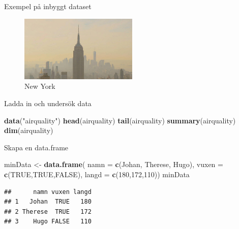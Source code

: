 \documentclass[
  11pt,
  ignorenonframetext,
]{beamer}
\newenvironment{Shaded}{\begin{snugshade}}{\end{snugshade}}
\newcommand{\DataTypeTok}[1]{\textcolor[rgb]{0.13,0.29,0.53}{#1}}
\newcommand{\DecValTok}[1]{\textcolor[rgb]{0.00,0.00,0.81}{#1}}
\newcommand{\KeywordTok}[1]{\textcolor[rgb]{0.13,0.29,0.53}{\textbf{#1}}}
\newcommand{\NormalTok}[1]{#1}
\newcommand{\OtherTok}[1]{\textcolor[rgb]{0.56,0.35,0.01}{#1}}
\newcommand{\StringTok}[1]{\textcolor[rgb]{0.31,0.60,0.02}{#1}}
\begin{document}

\begin{frame}[fragile]{Exempel på inbyggt dataset}
\protect\hypertarget{exempel-puxe5-inbyggt-dataset}{}
\begin{figure}
\centering
\includegraphics[width=0.5\textwidth,height=\textheight]{images/ny.jpeg}
\caption{New York}
\end{figure}

Ladda in och undersök data

\begin{Shaded}
\begin{Highlighting}[]
\KeywordTok{data}\NormalTok{(}\StringTok{"airquality"}\NormalTok{)}
\KeywordTok{head}\NormalTok{(airquality)}
\KeywordTok{tail}\NormalTok{(airquality)}
\KeywordTok{summary}\NormalTok{(airquality)}
\KeywordTok{dim}\NormalTok{(airquality)}
\end{Highlighting}
\end{Shaded}
\end{frame}


\begin{frame}[fragile]{Skapa en data.frame}
\protect\hypertarget{skapa-en-data.frame}{}
\begin{Shaded}
\begin{Highlighting}[]
\NormalTok{minData \textless{}{-}}\StringTok{ }\KeywordTok{data.frame}\NormalTok{(}
  \DataTypeTok{namn =} \KeywordTok{c}\NormalTok{(}\StringTok{\textquotesingle{}Johan\textquotesingle{}}\NormalTok{, }\StringTok{\textquotesingle{}Therese\textquotesingle{}}\NormalTok{, }\StringTok{\textquotesingle{}Hugo\textquotesingle{}}\NormalTok{), }
  \DataTypeTok{vuxen =} \KeywordTok{c}\NormalTok{(}\OtherTok{TRUE}\NormalTok{,}\OtherTok{TRUE}\NormalTok{,}\OtherTok{FALSE}\NormalTok{), }
  \DataTypeTok{langd =} \KeywordTok{c}\NormalTok{(}\DecValTok{180}\NormalTok{,}\DecValTok{172}\NormalTok{,}\DecValTok{110}\NormalTok{))}
\NormalTok{minData}
\end{Highlighting}
\end{Shaded}

\begin{verbatim}
##      namn vuxen langd
## 1   Johan  TRUE   180
## 2 Therese  TRUE   172
## 3    Hugo FALSE   110
\end{verbatim}
\end{frame}
\end{document}
